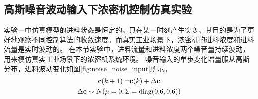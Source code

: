 \subsection{高斯噪音波动输入下浓密机控制仿真实验}
\label{sec:vi_hdp_noise}
实验一中仿真模型的进料状态是恒定的，只在某一时刻产生突变，其目的是为了更好地观察不同控制算法的收敛速度。而真实工业场景下，浓密机的进料浓度和进料流量是实时波动的。
在本节实验中，进料流量和进料浓度两个噪音量持续波动，用来模仿真实工业场景下的浓密机系统环境。
噪音输入的单步变化增量服从高斯分布，进料波动变化如图\ref{fig:noise_noise_input}所示。
\begin{equation}
\begin{split}
 \label{equ:noise_c_disturbance}
 \mathbf c(k+1) =&\mathbf c(k)+\Delta \mathbf c \\
 \Delta \mathbf c \sim N(\mu=0 ,
\Sigma&=\operatorname{diag}(0.6,0.6))
\end{split}
\end{equation}

